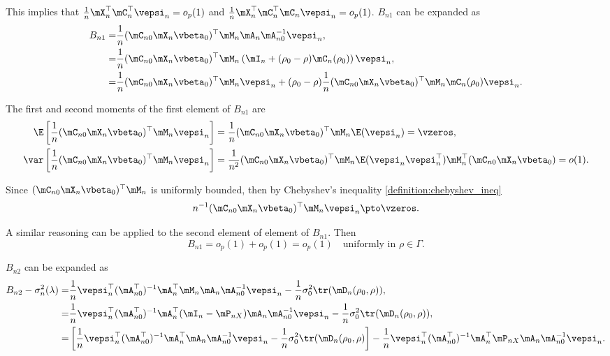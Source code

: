 \documentclass[english,12pt]{book}\usepackage[]{graphicx}\usepackage[]{xcolor}
\begin{document}
\begin{subappendices}
This implies that $\frac{1}{n}\mX_n^\top\mC_n^\top\vepsi_n  =o_p(1)$ and $\frac{1}{n}\mX_n^\top\mC_n^\top\mC_n\vepsi_n = o_p(1)$. $B_{n1}$ can be expanded as
\begin{equation*}
\begin{aligned}
B_{n1}  = &  \frac{1}{n}(\mC_{n0}\mX_n\vbeta_0)^\top\mM_n\mA_n\mA_{n0}^{-1}\vepsi_n, \\
        = & \frac{1}{n}(\mC_{n0}\mX_n\vbeta_0)^\top\mM_n\left(\mI_n + (\rho_0 - \rho)\mC_n (\rho_0)\right)\vepsi_n, \\
        = & \frac{1}{n}(\mC_{n0}\mX_n\vbeta_0)^\top\mM_n\vepsi_n + (\rho_0 - \rho)\frac{1}{n}(\mC_{n0}\mX_n\vbeta_0)^\top\mM_n\mC_n(\rho_0)\vepsi_n.
\end{aligned} 
\end{equation*}

The first and second moments of the first element of $B_{n1}$ are
\begin{equation*}
\begin{aligned}
\E\left[\frac{1}{n}(\mC_{n0}\mX_n\vbeta_0)^\top\mM_n\vepsi_n\right] & = \frac{1}{n}(\mC_{n0}\mX_n\vbeta_0)^\top\mM_n\E(\vepsi_n) = \vzeros, \\
\var\left[\frac{1}{n}(\mC_{n0}\mX_n\vbeta_0)^\top\mM_n\vepsi_n\right] & = \frac{1}{n^2}(\mC_{n0}\mX_n\vbeta_0)^\top\mM_n\E(\vepsi_n\vepsi_n^\top)\mM_n^\top(\mC_{n0}\mX_n\vbeta_0) = o(1).
\end{aligned}
\end{equation*}

Since $(\mC_{n0}\mX_n\vbeta_0)^\top\mM_n$ is uniformly bounded, then by Chebyshev's inequality \ref{definition:chebyshev_ineq}
\begin{equation*}
n^{-1}(\mC_{n0}\mX_n\vbeta_0)^\top\mM_n\vepsi_n\pto \vzeros.
\end{equation*}

A similar reasoning can be applied to the second element of element of $B_{n1}$. Then
\begin{equation*}
  B_{n1} =  o_p(1) + o_p(1) = o_p(1)\quad \mbox{uniformly in $\rho \in \Gamma$.}
\end{equation*}

$B_{n2}$ can be expanded as
\begin{equation*}
\begin{aligned}
B_{n2} - \sigma^2_n(\lambda) = & \frac{1}{n}\vepsi_n^\top(\mA_{n0}^\top)^{-1}\mA_n^\top\mM_n\mA_n\mA_{n0}^{-1}\vepsi_n -  \frac{1}{n}\sigma_0^2\tr(\mD_n(\rho_0, \rho)),\\
= & \frac{1}{n}\vepsi_n^\top(\mA_{n0}^\top)^{-1}\mA_n^\top(\mI_n - \mP_{nX})\mA_n\mA_{n0}^{-1}\vepsi_n -  \frac{1}{n}\sigma_0^2\tr(\mD_n(\rho_0, \rho)), \\
= & \left[\frac{1}{n}\vepsi_n^\top(\mA_{n0}^\top)^{-1}\mA_n^\top\mA_n\mA_{n0}^{-1}\vepsi_n -   \frac{1}{n}\sigma_0^2\tr(\mD_n(\rho_0, \rho)\right] - \frac{1}{n}\vepsi_n^\top(\mA_{n0}^\top)^{-1}\mA_n^\top\mP_{nX}\mA_n\mA_{n0}^{-1}\vepsi_n. 
\end{aligned}
\end{equation*}


\end{subappendices}
\end{document}

